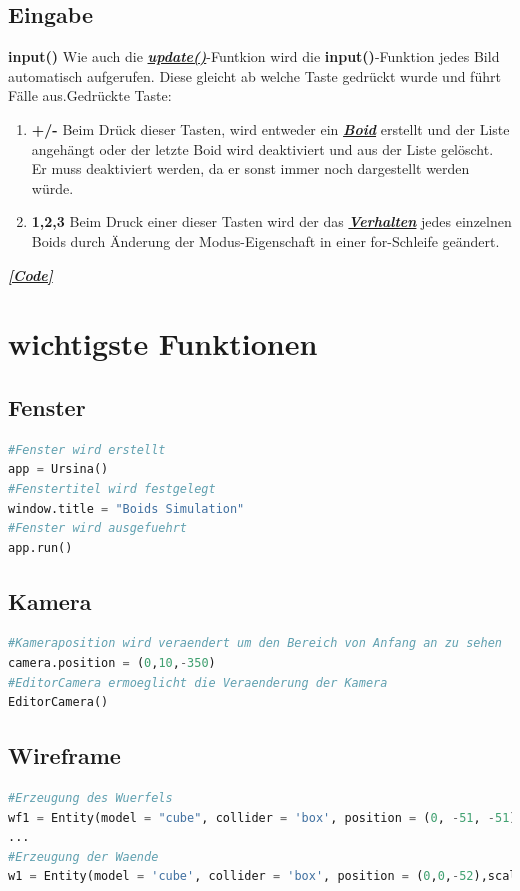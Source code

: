 \documentclass[a4paper, hidelinks, 12pt]{article}
\begin{document}
\subsection{Eingabe}
\textbf{input()}\label{sec:input}
Wie auch die \hyperref[sec:update]{\textbf{\emph{update()}}}-Funtkion\cite{update} wird die \textbf{input()}-Funktion jedes Bild automatisch aufgerufen. Diese gleicht ab welche Taste gedrückt wurde und führt Fälle aus\cite{input}.\newline Gedrückte Taste: 

\begin{enumerate}
\item \textbf{+/-} Beim Drück dieser Tasten, wird entweder ein \hyperref[sec:Boid]{\textbf{\emph{Boid}}} erstellt und der Liste angehängt oder der letzte Boid wird deaktiviert und aus der Liste gelöscht. Er muss deaktiviert werden, da er sonst immer noch dargestellt werden würde.
\item \textbf{1,2,3} Beim Druck einer dieser Tasten wird der das \hyperref[sec:Verhalten]{\textbf{\emph{Verhalten}}} jedes einzelnen Boids durch Änderung der Modus-Eigenschaft in einer for-Schleife geändert.
	
\end{enumerate}
\hyperref[Codeinput]{\textbf{\emph{[Code]}}}


\newpage
\section{wichtigste Funktionen}
\subsection{Fenster}\label{CodeFenster}
\begin{lstlisting}[style=mystyle, language=Python]
#Fenster wird erstellt
app = Ursina()
#Fenstertitel wird festgelegt
window.title = "Boids Simulation"
#Fenster wird ausgefuehrt
app.run()
\end{lstlisting}
\subsection{Kamera}\label{Kamera}
\begin{lstlisting}[style=mystyle, language=Python]
#Kameraposition wird veraendert um den Bereich von Anfang an zu sehen
camera.position = (0,10,-350)
#EditorCamera ermoeglicht die Veraenderung der Kamera
EditorCamera()
\end{lstlisting}
\subsection{Wireframe}\label{CodeRaum}
\begin{lstlisting}[style=mystyle, language=Python]
#Erzeugung des Wuerfels
wf1 = Entity(model = "cube", collider = 'box', position = (0, -51, -51), scale_x = 102)
...
#Erzeugung der Waende
w1 = Entity(model = 'cube', collider = 'box', position = (0,0,-52),scale=(110,110,0), color = color.red, alpha = 0)
\end{lstlisting}
\end{document}
